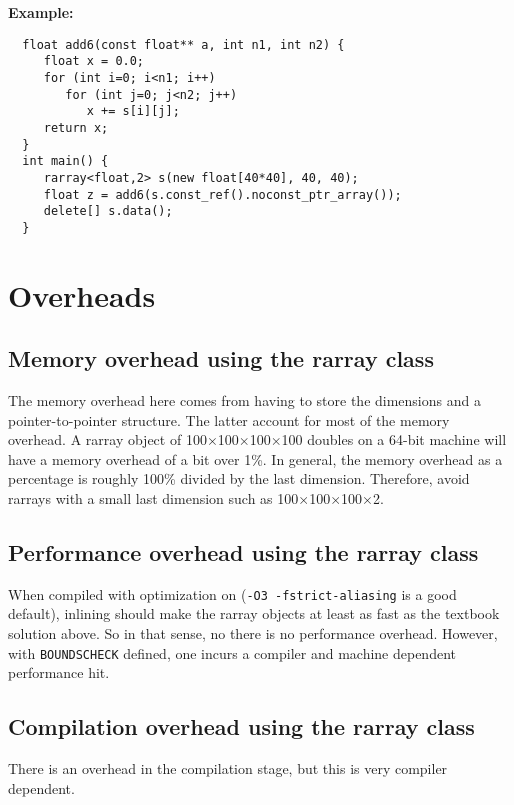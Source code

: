 \documentclass[12pt,twoside]{article}
\begin{document}
\noindent
{\bf Example:}
\vspace{-5pt}\begin{framed}\vspace{-14pt}%
\begin{verbatim}
  float add6(const float** a, int n1, int n2) {
     float x = 0.0;
     for (int i=0; i<n1; i++)
        for (int j=0; j<n2; j++)
           x += s[i][j];
     return x;
  }
  int main() {
     rarray<float,2> s(new float[40*40], 40, 40);
     float z = add6(s.const_ref().noconst_ptr_array());
     delete[] s.data();
  }
\end{verbatim}\vspace{-14pt}
\end{framed}

\section{Overheads}

\subsection{Memory overhead using the rarray class}

The memory overhead here comes from having to store the dimensions and a pointer-to-pointer structure.  The latter account for most of the memory overhead.   A rarray object of 100$\times$100$\times$100$\times$100  doubles on a 64-bit machine will have a memory overhead of a bit over 1\%. In general, the memory overhead as a percentage is roughly 100\% divided by the last dimension. Therefore, avoid rarrays with a small last dimension such as 100$\times$100$\times$100$\times$2.

\subsection{Performance overhead using the rarray class}

When compiled with optimization on (\texttt{-O3 -fstrict-aliasing} is a good default), inlining should make the rarray objects at least as fast as the textbook solution above. %
So in that sense, no there is no performance overhead.  
However, with \texttt{{\tt BOUNDSCHECK}} defined, one incurs a compiler and machine dependent performance hit.


\subsection{Compilation overhead using the rarray class}

There is an overhead in the compilation stage, but this is very compiler dependent.
\end{document}
